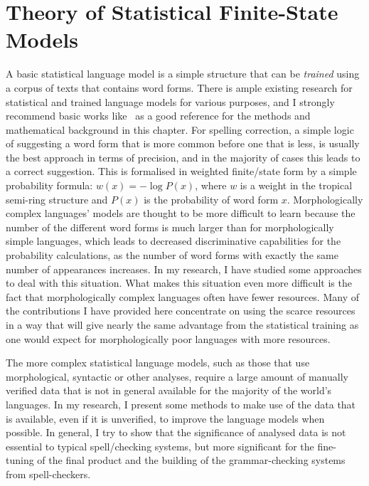 \documentclass[officiallayout,final]{unihelcompling}
\begin{document}
\section{Theory of Statistical Finite-State Models}
\label{sec:statistical}

A basic statistical language model is a simple structure that can be
\emph{trained} using a corpus of texts that contains word forms. There is ample
existing research for statistical and trained language models for various
purposes, and I strongly recommend basic works
like~\citet{manning1999foundations} as a good reference for the methods and
mathematical background in this chapter.  For spelling correction, a simple
logic of suggesting a word form that is more common before one that is less, is
usually the best approach in terms of precision, and in the majority of cases
this leads to a correct suggestion. This is formalised in weighted
finite\-/state form by a simple probability formula: $w(x) = -\log P(x)$, where
$w$ is a weight in the tropical semi-ring structure and $P(x)$ is the probability
of word form $x$.  Morphologically complex languages' models are thought to be
more difficult to learn because the number of the different word forms is much
larger than for morphologically simple languages, which leads to decreased
discriminative capabilities for the probability calculations, as the number of
word forms with exactly the same number of appearances increases. In my
research, I have studied some approaches to deal with this situation.  What
makes this situation even more difficult is the fact that morphologically
complex languages often have fewer resources.  Many of the contributions I have
provided here concentrate on using the scarce resources in a way that will give
nearly the same advantage from the statistical training as one would expect for
morphologically poor languages with more resources.

The more complex statistical language models, such as those that use
morphological, syntactic or other analyses, require a large amount of manually
verified data that is not in general available for the majority of the world's
languages. In my research, I present some methods to make use of the data that
is available, even if it is unverified, to improve the language models when
possible. In general, I try to show that the significance of analysed data is
not essential to typical spell\-/checking systems, but more significant for the
fine-tuning of the final product and the building of the grammar-checking
systems from spell-checkers.
\end{document}
